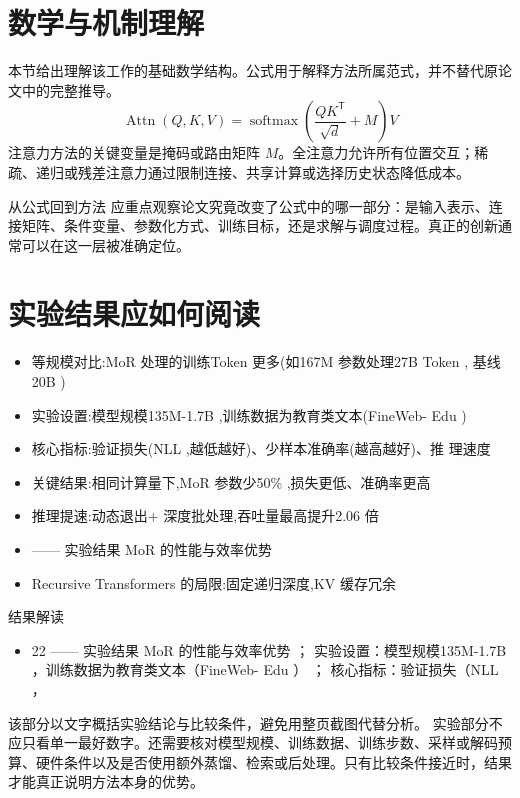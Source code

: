 \documentclass[UTF8,11pt,a4paper]{ctexart}
\begin{document}
\section{数学与机制理解}
本节给出理解该工作的基础数学结构。公式用于解释方法所属范式，并不替代原论文中的完整推导。
\begin{equation}
\operatorname{Attn}(Q,K,V)=\operatorname{softmax}\!\left(\frac{QK^{\mathsf T}}{\sqrt d}+M\right)V
\end{equation}
注意力方法的关键变量是掩码或路由矩阵 $M$。全注意力允许所有位置交互；稀疏、递归或残差注意力通过限制连接、共享计算或选择历史状态降低成本。

\begin{keybox}{从公式回到方法}
应重点观察论文究竟改变了公式中的哪一部分：是输入表示、连接矩阵、条件变量、参数化方式、训练目标，还是求解与调度过程。真正的创新通常可以在这一层被准确定位。
\end{keybox}


\section{实验结果应如何阅读}
\begin{itemize}
\item 等规模对比:MoR 处理的训练Token 更多(如167M 参数处理27B Token , 基线20B )
\item 实验设置:模型规模135M-1.7B ,训练数据为教育类文本(FineWeb- Edu )
\item 核心指标:验证损失(NLL ,越低越好)、少样本准确率(越高越好)、推 理速度
\item 关键结果:相同计算量下,MoR 参数少50\% ,损失更低、准确率更高
\item 推理提速:动态退出+ 深度批处理,吞吐量最高提升2.06 倍
\item —— 实验结果 MoR 的性能与效率优势
\item Recursive Transformers 的局限:固定递归深度,KV 缓存冗余
\end{itemize}

\begin{notebox}{结果解读}
\begin{itemize}
\item 22 —— 实验结果 MoR 的性能与效率优势 ； 实验设置：模型规模135M-1.7B ，训练数据为教育类文本（FineWeb- Edu ） ； 核心指标：验证损失（NLL ，
\end{itemize}
\end{notebox}

该部分以文字概括实验结论与比较条件，避免用整页截图代替分析。
实验部分不应只看单一最好数字。还需要核对模型规模、训练数据、训练步数、采样或解码预算、硬件条件以及是否使用额外蒸馏、检索或后处理。只有比较条件接近时，结果才能真正说明方法本身的优势。
\end{document}
